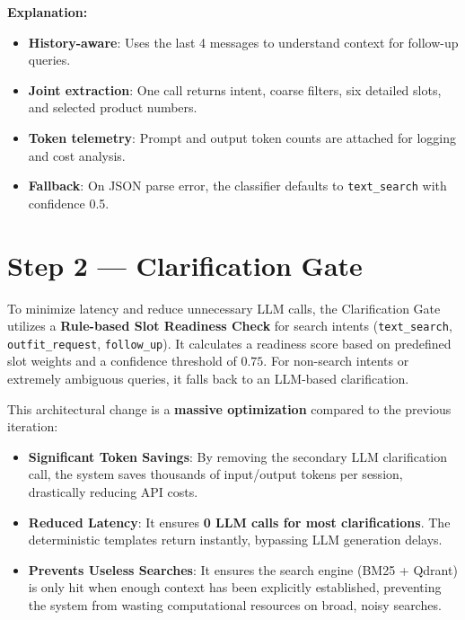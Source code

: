 \textbf{Explanation:}
\begin{itemize}
    \item \textbf{History-aware}: Uses the last 4 messages to understand context for follow-up queries.
    \item \textbf{Joint extraction}: One call returns intent, coarse filters, six detailed slots, and selected product numbers.
    \item \textbf{Token telemetry}: Prompt and output token counts are attached for logging and cost analysis.
    \item \textbf{Fallback}: On JSON parse error, the classifier defaults to \texttt{text\_search} with confidence 0.5.
\end{itemize}

\section{Step 2 --- Clarification Gate}

\begin{tcolorbox}[title=Method: Rule-Based Slot Readiness \& Hybrid Clarification]
To minimize latency and reduce unnecessary LLM calls, the Clarification Gate utilizes a \textbf{Rule-based Slot Readiness Check} for search intents (\texttt{text\_search}, \texttt{outfit\_request}, \texttt{follow\_up}). It calculates a readiness score based on predefined slot weights and a confidence threshold of $0.75$. For non-search intents or extremely ambiguous queries, it falls back to an LLM-based clarification.
\end{tcolorbox}

\begin{tcolorbox}[colback=green!5,colframe=green!40!black,title=Massive Token \& Latency Optimization]
This architectural change is a \textbf{massive optimization} compared to the previous iteration:
\begin{itemize}
    \item \textbf{Significant Token Savings}: By removing the secondary LLM clarification call, the system saves thousands of input/output tokens per session, drastically reducing API costs.
    \item \textbf{Reduced Latency}: It ensures \textbf{0 LLM calls for most clarifications}. The deterministic templates return instantly, bypassing LLM generation delays.
    \item \textbf{Prevents Useless Searches}: It ensures the search engine (BM25 + Qdrant) is only hit when enough context has been explicitly established, preventing the system from wasting computational resources on broad, noisy searches.
\end{itemize}
\end{tcolorbox}

